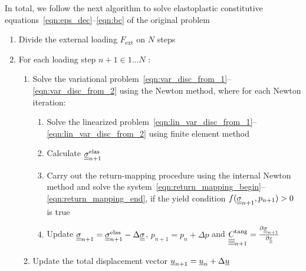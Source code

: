 \documentclass[12pt]{article}
\begin{document}
In total, we follow the next algorithm to solve elastoplastic constitutive equations~\eqref{eqn:eps_dec}--\eqref{eqn:bc} of the original problem
\begin{enumerate}
    \item Divide the external loading $F_\text{ext}$ on $N$ steps 
    \item For each loading step $n+1 \in {1 \dots N}$ :
    \begin{enumerate}
        \item Solve the variational problem~\eqref{eqn:var_disc_from_1}--\eqref{eqn:var_disc_from_2} using the Newton method, where for each Newton iteration:
        \begin{enumerate}
            \item Solve the linearized problem~\eqref{eqn:lin_var_disc_from_1}--\eqref{eqn:lin_var_disc_from_2} using finite element method
            \item Calculate $\underline{\underline{\sigma}}_{n+1}^{\text{elas}}$ 
            \item Carry out the return-mapping procedure using the internal Newton method and solve the system~\eqref{eqn:return_mapping_begin}--\eqref{eqn:return_mapping_end}, if the yield condition $f(\underline{\underline{\sigma}}_{n+1}, p_{n+1}) > 0$ is true
            \item Update $\underline{\underline{\sigma}}_{n+1} = \underline{\underline{\sigma}}_{n+1}^{\text{elas}} - \Delta\underline{\underline{\sigma}}$, $p_{n+1} = p_n + \Delta p$ and $\underline{\underline{\underline{\underline{C_{}}}}}^\text{tang}_{n+1} = \frac{\partial \underline{\underline{\sigma}}_{n+1}}{\partial\underline{\underline{\varepsilon}}}$
        \end{enumerate}
        \item Update the total displacement vector $\underline{u}_{n+1} = \underline{u}_n + \Delta\underline{u}$
    \end{enumerate}
\end{enumerate}
\end{document}
